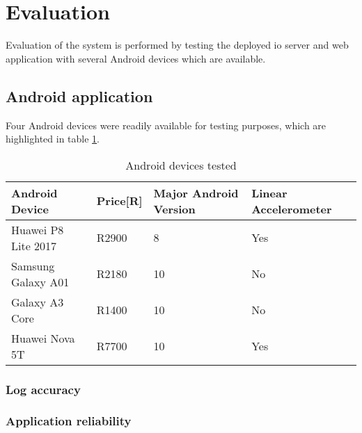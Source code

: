 \section{Evaluation}
Evaluation of the system is performed by testing the deployed \ac{io} server and web application with several Android devices which are available.

\subsection{Android application}
Four Android devices were readily available for testing purposes, which are highlighted in table \ref{tab:android_devices_tested}.

\begin{table}[H]
\caption{Android devices tested}
\label{tab:android_devices_tested}
\begin{tabular}{llll}
\hline
Android Device      & Price[R]  & Major Android Version & Linear Accelerometer \\ \hline
Huawei P8 Lite 2017 & R2900     & 8                     & Yes                  \\
Samsung Galaxy A01  & R2180     & 10                    & No                   \\
Galaxy A3 Core      & R1400     & 10                    & No                   \\
Huawei Nova 5T      & R7700     & 10                    & Yes                  \\ \hline
\end{tabular}
\end{table}

\subsubsection{Log accuracy}


\subsubsection{Application reliability}



\pagebreak

